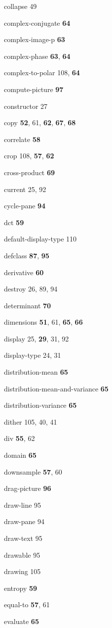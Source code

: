 \begin{theindex}
\item collapse 49
\item complex-conjugate {\bf 64}
\item complex-image-p {\bf 63}
\item complex-phase {\bf 63}, {\bf 64}
\item complex-to-polar 108, {\bf 64}
\item compute-picture {\bf 97}
\item constructor 27
\item copy {\bf 52}, 61, {\bf 62}, {\bf 67}, {\bf 68}
\item correlate {\bf 58}
\item crop 108, {\bf 57}, {\bf 62}
\item cross-product {\bf 69}
\item current 25, 92
\item cycle-pane {\bf 94}
\item dct {\bf 59}
\item default-display-type 110
\item defclass {\bf 87}, {\bf 95}
\item derivative {\bf 60}
\item destroy 26, 89, 94
\item determinant {\bf 70}
\item dimensions {\bf 51}, 61, {\bf 65}, {\bf 66}
\item display 25, {\bf 29}, 31, 92
\item display-type 24, 31
\item distribution-mean {\bf 65}
\item distribution-mean-and-variance {\bf 65}
\item distribution-variance {\bf 65}
\item dither 105, 40, 41
\item div {\bf 55}, 62
\item domain {\bf 65}
\item downsample {\bf 57}, 60
\item drag-picture {\bf 96}
\item draw-line 95
\item draw-pane 94
\item draw-text 95
\item drawable 95
\item drawing 105
\item entropy {\bf 59}
\item equal-to {\bf 57}, 61
\item evaluate {\bf 65}

\end{theindex}
